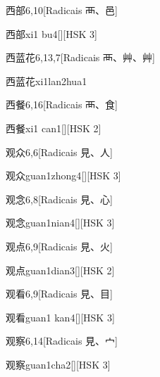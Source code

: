 \begin{entry}{西部}{6,10}[Radicais ⾑、⾢]
  \begin{phonetics}{西部}{xi1 bu4}[][HSK 3]
  \end{phonetics}
\end{entry}

\begin{entry}{西蓝花}{6,13,7}[Radicais ⾑、⾋、⾋]
  \begin{phonetics}{西蓝花}{xi1lan2hua1}
  \end{phonetics}
\end{entry}

\begin{entry}{西餐}{6,16}[Radicais ⾑、⾷]
  \begin{phonetics}{西餐}{xi1 can1}[][HSK 2]
  \end{phonetics}
\end{entry}

\begin{entry}{观众}{6,6}[Radicais ⾒、⼈]
  \begin{phonetics}{观众}{guan1zhong4}[][HSK 3]
  \end{phonetics}
\end{entry}

\begin{entry}{观念}{6,8}[Radicais ⾒、⼼]
  \begin{phonetics}{观念}{guan1nian4}[][HSK 3]
  \end{phonetics}
\end{entry}

\begin{entry}{观点}{6,9}[Radicais ⾒、⽕]
  \begin{phonetics}{观点}{guan1dian3}[][HSK 2]
  \end{phonetics}
\end{entry}

\begin{entry}{观看}{6,9}[Radicais ⾒、⽬]
  \begin{phonetics}{观看}{guan1 kan4}[][HSK 3]
  \end{phonetics}
\end{entry}

\begin{entry}{观察}{6,14}[Radicais ⾒、⼧]
  \begin{phonetics}{观察}{guan1cha2}[][HSK 3]
  \end{phonetics}
\end{entry}

